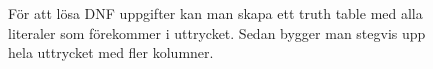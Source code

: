 \documentclass[a5paper]{article}
\begin{document}
\begin{figure}[ht]
	\centering
	\caption*{För att lösa DNF uppgifter kan man skapa ett truth table med alla literaler som förekommer i uttrycket.
		Sedan bygger man stegvis upp hela uttrycket med fler kolumner.
	}\label{fig:2018-5-1}
\end{figure}
\end{document}
